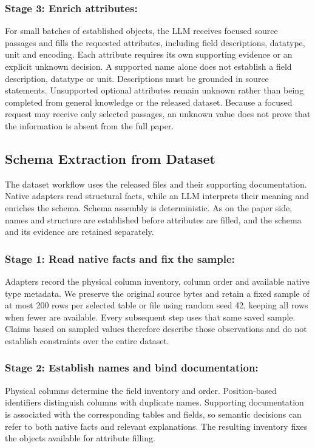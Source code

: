 \subsubsection{Stage 3: Enrich attributes:}
For small batches of established objects, the LLM receives focused source
passages and fills the requested attributes, including field descriptions,
datatype, unit and encoding. Each attribute requires its own supporting
evidence or an explicit unknown decision. A supported name alone does not
establish a field description, datatype or unit. Descriptions must be grounded
in source statements.
Unsupported optional attributes remain unknown rather than being completed
from general knowledge or the released dataset. Because a focused request
may receive only selected passages, an unknown value does not prove that
the information is absent from the full paper.

\subsection{Schema Extraction from Dataset}
\label{sec:dataset-workflow}

The dataset workflow uses the released files and their supporting
documentation. Native adapters read structural facts, while an LLM
interprets their meaning and enriches the schema. Schema assembly is
deterministic. As on the paper side, names and structure are established
before attributes are filled, and the schema and its evidence are retained
separately.

\subsubsection{Stage 1: Read native facts and fix the sample:}
Adapters record the physical column inventory, column order and available
native type metadata. We preserve the original source bytes and retain a
fixed sample of at most 200 rows per selected table or file using random
seed 42, keeping all rows when fewer are available. Every subsequent step uses that same saved
sample. Claims based on sampled values therefore describe those observations
and do not establish constraints over the entire dataset.

\subsubsection{Stage 2: Establish names and bind documentation:}
Physical columns determine the field inventory and order. Position-based
identifiers distinguish columns with duplicate names. Supporting
documentation is associated with the corresponding tables and fields, so
semantic decisions can refer to both native facts and relevant explanations.
The resulting inventory fixes the objects available for attribute filling.

